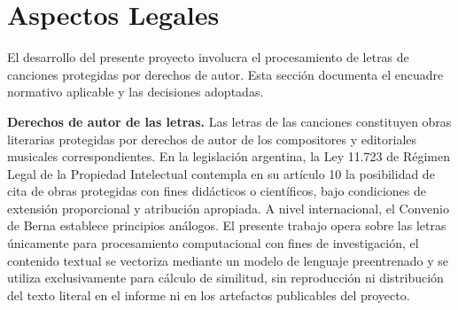 \section{Aspectos Legales}
\label{sec:legales}

El desarrollo del presente proyecto involucra el procesamiento de letras de canciones protegidas por derechos de autor. Esta sección documenta el encuadre normativo aplicable y las decisiones adoptadas.

\textbf{Derechos de autor de las letras.} Las letras de las canciones constituyen obras literarias protegidas por derechos de autor de los compositores y editoriales musicales correspondientes. En la legislación argentina, la Ley 11.723 de Régimen Legal de la Propiedad Intelectual contempla en su artículo 10 la posibilidad de cita de obras protegidas con fines didácticos o científicos, bajo condiciones de extensión proporcional y atribución apropiada. A nivel internacional, el Convenio de Berna establece principios análogos. El presente trabajo opera sobre las letras únicamente para procesamiento computacional con fines de investigación, el contenido textual se vectoriza mediante un modelo de lenguaje preentrenado y se utiliza exclusivamente para cálculo de similitud, sin reproducción ni distribución del texto literal en el informe ni en los artefactos publicables del proyecto.
